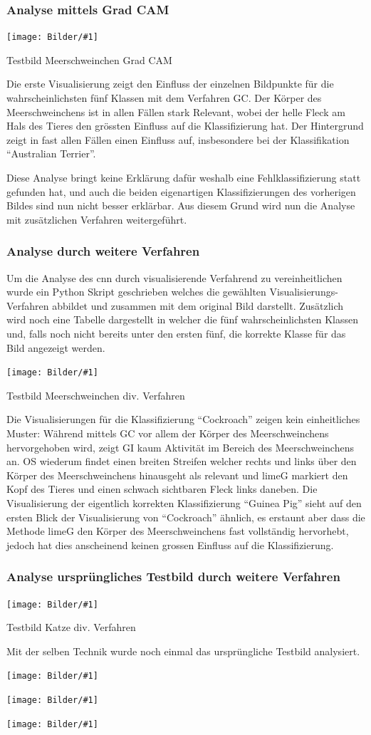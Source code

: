 \documentclass[
  12pt, %
  a4paper, %
  oneside, %
  openany, 
  numbers=noenddot, %
  BCOR=5mm, %
  parskip=half*, %
  thesis, %
]{bfhbook}
\newcommand{\imgText}[3]{
\begin{center}
    \begin{minipage}[t]{0.6\textwidth}
    		\vspace{0pt}
		\texttt{[image: Bilder/\#1]}
		\caption{#2}
	\end{minipage}\hfill
    \begin{minipage}[t]{0.4\textwidth}
    		\vspace{20pt}
  		#3
    \end{minipage}
\end{center}
}
\begin{document}
\subsubsection*{Analyse mittels Grad CAM}
\imgText{Oreo-Grad-Cam-Classes.png}{Testbild Meerschweinchen Grad CAM}{
Die erste Visualisierung zeigt den Einfluss der einzelnen Bildpunkte für die wahrscheinlichsten fünf Klassen mit dem Verfahren \Gls{GC}. Der Körper des Meerschweinchens ist in allen Fällen stark Relevant, wobei der helle Fleck am Hals des Tieres den grössten Einfluss auf die Klassifizierung hat. Der Hintergrund zeigt in fast allen Fällen einen Einfluss auf, insbesondere bei der Klassifikation ``Australian Terrier''.
}
Diese Analyse bringt keine Erklärung dafür weshalb eine Fehlklassifizierung statt gefunden hat, und auch die beiden eigenartigen Klassifizierungen des vorherigen Bildes sind nun nicht besser erklärbar. Aus diesem Grund wird nun die Analyse mit zusätzlichen Verfahren weitergeführt.

\subsubsection*{Analyse durch weitere Verfahren}
Um die Analyse des \Gls{cnn} durch visualisierende Verfahrend zu vereinheitlichen wurde ein Python Skript geschrieben welches die gewählten Visualisierungs-Verfahren abbildet und zusammen mit dem original Bild darstellt. Zusätzlich wird noch eine Tabelle dargestellt in welcher die fünf wahrscheinlichsten Klassen und, falls noch nicht bereits unter den ersten fünf, die korrekte Klasse für das Bild angezeigt werden.
\imgText{Oreo-Classification.png}{Testbild Meerschweinchen div. Verfahren}{
Die Visualisierungen für die Klassifizierung ``Cockroach''  zeigen kein einheitliches Muster: \break 
Während mittels \Gls{GC} vor allem der Körper des Meerschweinchens hervorgehoben wird, zeigt \Gls{GI} kaum Aktivität im Bereich des Meerschweinchens an. \break 
\Gls{OS} wiederum findet einen breiten Streifen welcher rechts und links über den Körper des Meerschweinchens hinausgeht als relevant und \Gls{limeG} markiert den Kopf des Tieres und einen schwach sichtbaren Fleck links daneben. \break
Die Visualisierung der eigentlich korrekten Klassifizierung ``Guinea Pig'' sieht auf den ersten Blick der Visualisierung von ``Cockroach'' ähnlich, es erstaunt aber dass die Methode \Gls{limeG} den Körper des Meerschweinchens fast vollständig hervorhebt, jedoch hat dies anscheinend keinen grossen Einfluss auf die Klassifizierung.
}

\subsubsection*{Analyse ursprüngliches Testbild durch weitere Verfahren}
\imgText{Mira-Classification.png}{Testbild Katze div. Verfahren}{
Mit der selben Technik wurde noch einmal das ursprüngliche Testbild analysiert.
}
\imgText{Mira-Classification-2-only-tabby.png}{}{}
\imgText{Merlin-Classification.png}{}{}
\imgText{Toilett-Tissue-Classification.png}{}{}
\end{document}
